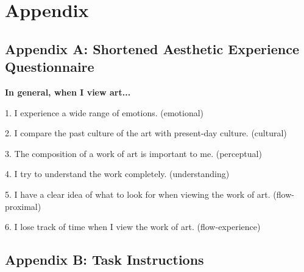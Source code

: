 \documentclass[../main.tex]{subfiles}
\begin{document}
\section{Appendix}
\subsection{Appendix A: Shortened Aesthetic Experience Questionnaire} 
	
	\textbf{In general, when I view art...}
		
	1. I experience a wide range of emotions. (emotional)
	
	2. I compare the past culture of the art with present-day culture. (cultural)
	
	3. The composition of a work of art is important to me. (perceptual)
	
	
	4. I try to understand the work completely. (understanding)
	
	
	5. I have a clear idea of what to look for when viewing the work of art. (flow-proximal)
	
	
	6. I lose track of time when I view the work of art. (flow-experience)

\newpage

\subsection{Appendix B: Task Instructions}
	
\end{document}
